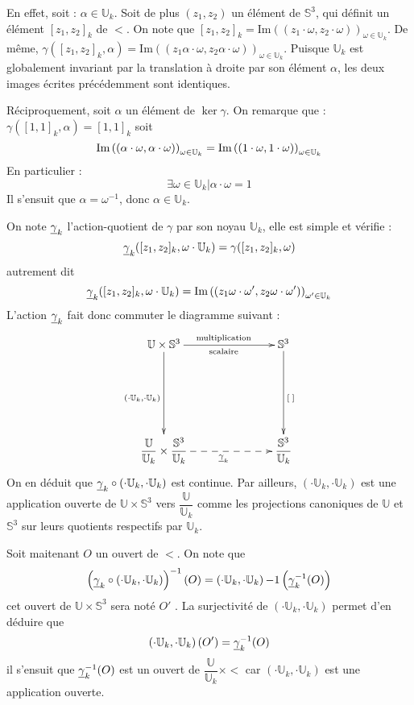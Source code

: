 \par
En effet, soit : $\alpha\in\mathbb{U}_k$. Soit de plus $(z_1,z_2)$ un \'el\'ement de $\mathbb{S}^3$, qui d\'efinit un \'el\'ement $[z_1,z_2]_k$ de $\lt$. %
On note que $[z_1,z_2]_k=\text{Im}((z_1\cdot\omega ,z_2\cdot\omega ))_{\omega\in\mathbb{U}_k}$. %
De m\^eme, $\gamma ([z_1,z_2]_k,\alpha)=\text{Im}((z_1\alpha\cdot\omega ,z_2\alpha\cdot\omega ))_{\omega\in\mathbb{U}_k}$. %
Puisque $\mathbb{U}_k$ est globalement invariant par la translation \`a droite par son \'el\'ement $\alpha$, les deux images \'ecrites pr\'ec\'edemment sont identiques.

\par
R\'eciproquement, soit $\alpha$ un \'el\'ement de $\ker\gamma$. On remarque que : $\gamma([1,1]_k,\alpha)=[1,1]_k$ soit
\[\pl{\alpha}{\alpha}=\pl{1}{1}\]
En particulier : \[\exists\omega\in\mathbb{U}_k|\alpha\cdot\omega=1\]
Il s'ensuit que $\alpha=\omega^{-1}$, donc $\alpha\in\mathbb{U}_k$.
\par
On note $\gk$ l'action-quotient de $\gamma$ par son noyau $\mathbb{U}_k$, elle est simple et v\'erifie :
\[\gk([z_1,z_2]_k,\omega\cdot\mathbb{U}_k)=\gamma([z_1,z_2]_k,\omega)\]
autrement dit
\[\gk([z_1,z_2]_k,\omega\cdot\mathbb{U}_k)=\pl[\omega ']{z_1\omega}{z_2\omega}\]
L'action $\gk$ fait donc commuter le diagramme suivant :
\[%
\xymatrixrowsep{1in}              %
\xymatrixcolsep{1in}
\xymatrix%
{%
\mathbb{U}\times\mathbb{S}^3\ar[d]_{\left(\cdot\mathbb{U}_k,\cdot\mathbb{U}_k\right)}\ar[r]_{\text{scalaire}}^{\text{multiplication}}&\mathbb{S}^3\ar[d]^{[\; ]}\\%
\dfrac{\mathbb{U}}{\mathbb{U}_k}\times\lt\ar@{-->}[r]_{\gk}&\lt%
}%
\]
On en d\'eduit que $\gk\circ \left(\cdot\mathbb{U}_k,\cdot\mathbb{U}_k\right)$ est continue. %
Par ailleurs, $\left(\cdot\mathbb{U}_k,\cdot\mathbb{U}_k\right)$ est une application ouverte de $\mathbb{U}\times\mathbb{S}^3$ vers $\dfrac{\mathbb{U}}{\mathbb{U}_k}$ %
comme les projections canoniques de $\mathbb{U}$ et $\mathbb{S}^3$ sur leurs quotients respectifs par $\mathbb{U}_k$.
\par
Soit maitenant $O$ un ouvert de $\lt$. On note que
\[\left(\gk\circ\left(\cdot\mathbb{U}_k,\cdot\mathbb{U}_k\right)\right)^{-1}(O)=%
\left(\cdot\mathbb{U}_k,\cdot\mathbb{U}_k\right){-1}\left(\gk^{-1}(O)\right)\]
cet ouvert de $\mathbb{U}\times\mathbb{S}^3$ sera not\'e $O'$ .%
La surjectivit\'e de $\left(\cdot\mathbb{U}_k,\cdot\mathbb{U}_k\right)$ permet d'en d\'eduire que
\[\left(\cdot\mathbb{U}_k,\cdot\mathbb{U}_k\right)(O')=\gk^{-1}(O)\]
il s'ensuit que $\gk^{-1}(O)$ est un ouvert de $\dfrac{\mathbb{U}}{\mathbb{U}_k}\times\lt$ car $\left(\cdot\mathbb{U}_k,\cdot\mathbb{U}_k\right)$ est une application ouverte.

